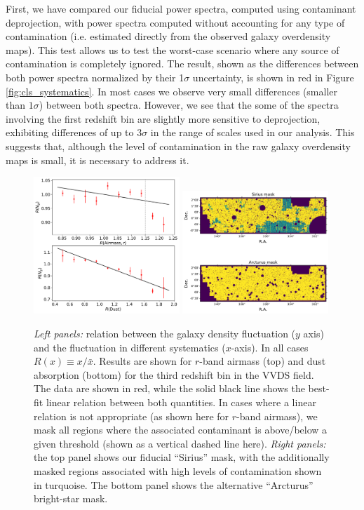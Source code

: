 \documentclass[a4paper,11pt]{article}
\begin{document}
      First, we have compared our fiducial power spectra, computed using contaminant deprojection, with power spectra computed without accounting for any type of contamination (i.e. estimated directly from the observed galaxy overdensity maps). This test allows us to test the worst-case scenario where any source of contamination is completely ignored. The result, shown as the differences between both power spectra normalized by their 1$\sigma$ uncertainty, is shown in red in Figure \ref{fig:cls_systematics}. In most cases we observe very small differences (smaller than $1\sigma$) between both spectra. However, we see that the some of the spectra involving the first redshift bin are slightly more sensitive to deprojection, exhibiting differences of up to 3$\sigma$ in the range of scales used in our analysis. This suggests that, although the level of contamination in the raw galaxy overdensity maps is small, it is necessary to address it.
      \begin{figure}
        \centering
        \includegraphics[width=0.49\textwidth]{figures/ndens_syst.pdf}
        \includegraphics[width=0.49\textwidth]{figures/systmask.pdf}
        \caption{{\sl Left panels:} relation between the galaxy density fluctuation ($y$ axis) and the fluctuation in different systematics ($x$-axis). In all cases $R(x)\equiv x/\bar{x}$. Results are shown for $r$-band airmass (top) and dust absorption (bottom) for the third redshift bin in the VVDS field. The data are shown in red, while the solid black line shows the best-fit linear relation between both quantities. In cases where a linear relation is not appropriate (as shown here for $r$-band airmass), we mask all regions where the associated contaminant is above/below a given threshold (shown as a vertical dashed line here). {\sl Right panels:} the top panel shows our fiducial ``Sirius'' mask, with the additionally masked regions associated with high levels of contamination shown in turquoise. The bottom panel shows the alternative ``Arcturus'' bright-star mask.}
        \label{fig:ndens_syst}
      \end{figure}
      
\end{document}
